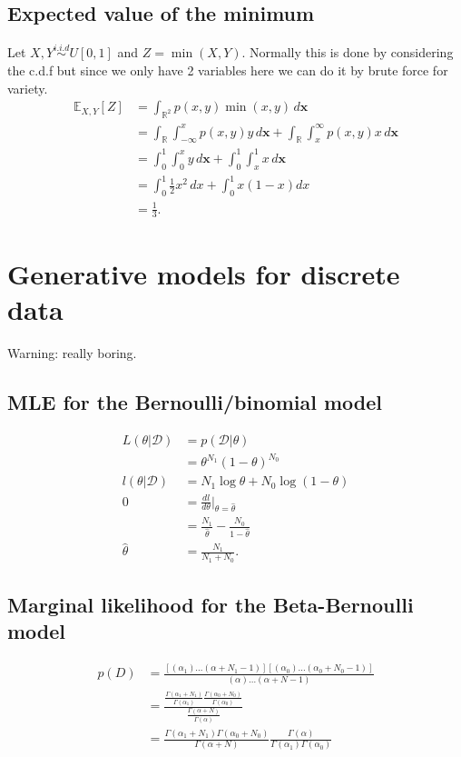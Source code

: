 \documentclass{article}
\begin{document}
\subsection{Expected value of the minimum}
Let $X,Y\overset{i.i.d}{\sim}U[0,1]$ and $Z = \min(X,Y)$. Normally this is done by considering the c.d.f but since we only have 2 variables here we can do it by brute force for variety.
\begin{align*}
\mathbb{E}_{X,Y}[Z] &= \int_{\mathbb{R}^2} p(x,y)\min(x,y) \,d\mathbf{x}\\
&= \int_{\mathbb{R}} \int_{-\infty}^{x} p(x,y)y \,d\mathbf{x} + \int_{\mathbb{R}} \int_{x}^{\infty} p(x,y)x \,d\mathbf{x}\\
&= \int_{0}^{1} \int_{0}^{x} y \,d\mathbf{x} + \int_{0}^{1} \int_{x}^{1} x \,d\mathbf{x}\\
&= \int_{0}^{1} \frac{1}{2}x^2 \,dx + \int_{0}^{1} x(1-x) dx\\
&= \frac{1}{3}.
\end{align*}
\pagebreak

\section{Generative models for discrete data}
Warning: really boring.
\subsection{MLE for the Bernoulli/binomial model}
\begin{align*}
L(\theta|\mathcal{D}) &= p(\mathcal{D}|\theta)\\
&= \theta^{N_1} (1-\theta)^{N_0}\\
l(\theta|\mathcal{D}) &= N_1\log\theta + N_0\log(1-\theta)\\
0 &= \frac{dl}{d\theta}\bigg|_{\theta=\hat\theta}\\
&= \frac{N_1}{\hat\theta} - \frac{N_0}{1-\hat\theta}\\
\hat\theta &= \frac{N_1}{N_1+N_0}.
\end{align*}

\subsection{Marginal likelihood for the Beta-Bernoulli model}
\begin{align*}
p(D) &= \frac{[(\alpha_1)\dots(\alpha+N_1-1)] [(\alpha_0)\dots(\alpha_0+N_0-1)]}{(\alpha)\dots(\alpha+N-1)}\\
&= \frac{\frac{\Gamma(\alpha_1+N_1)}{\Gamma(\alpha_1)} \frac{\Gamma(\alpha_0+N_0)}{\Gamma(\alpha_0)}}{\frac{\Gamma(\alpha+N)}{\Gamma(\alpha)}}\\
&= \frac{\Gamma(\alpha_1+N_1)\Gamma(\alpha_0+N_0)}{\Gamma(\alpha+N)} \frac{\Gamma(\alpha)}{\Gamma(\alpha_1)\Gamma(\alpha_0)}
\end{align*}
\end{document}
